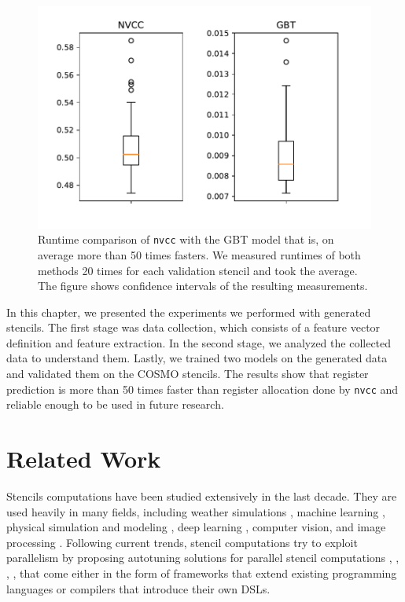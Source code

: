 \documentclass[sigplan,\review anonymous]{acmart}
\begin{document}
\begin{figure}
  \centering
  \includegraphics[width=0.8\columnwidth]{images/nvcc_vs_gbt.pdf}
  \caption{Runtime comparison of \texttt{nvcc} with the GBT model
  that is, on average more than 50 times fasters. We measured
  runtimes of both methods 20 times for each validation stencil
  and took the average. The figure shows confidence
  intervals of the resulting measurements. }
  \label{fig:nvcc_vs_gbt}
\end{figure}

In this chapter, we presented the experiments we performed with generated
stencils. The first stage was data collection, which consists of a feature
vector definition and feature extraction. In the second stage, we analyzed
the collected data to understand them. Lastly, we trained two models on the
generated data and validated them on the COSMO stencils. The results show
that register prediction is more than 50 times faster than register allocation
done by \texttt{nvcc} and reliable enough to be used in future research.

\section{Related Work}
Stencils computations have been studied extensively in the last decade.
They are used heavily in many fields, including weather
simulations \cite{stella}, machine learning \cite{gpu_ml}, physical simulation
and modeling \cite{stencil_phys_sim}, deep learning \cite{tvm}, computer
vision, and image processing \cite{halide}.
Following current trends, stencil computations try to exploit parallelism
by proposing autotuning solutions for parallel stencil computations
\cite{10.1145/1989493.1989508}, \cite{5470421}, \cite{6012879},
\cite{gridtools}, that come either in the form of frameworks \cite{gridtools}
that extend existing programming languages or compilers that introduce
their own DSLs. \cite{10.1145/1989493.1989508}
\end{document}
